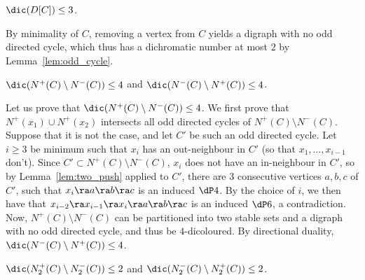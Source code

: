 \begin{claim}\label{clm:C_bounded}
$\dic(D[C]) \leq 3$. 
\end{claim}

\begin{subproof}
By minimality of $C$, removing a vertex from $C$ yields a digraph with no odd directed cycle, which thus has a dichromatic number at most $2$ by Lemma~\ref{lem:odd_cycle}.
\end{subproof}

\begin{claim} \label{clm:N+moinsN-_bounded}
$\dic(N^{+}(C) \setminus N^{-}(C)) \leq 4$ and  $\dic(N^{-}(C) \setminus N^{+}(C)) \leq 4$. 
\end{claim}

\begin{subproof}
Let us prove that $\dic(N^{+}(C) \setminus N^{-}(C)) \leq 4$.  
We first prove that $N^+(x_1) \cup N^+(x_2)$ intersects all odd directed  cycles of $N^{+}(C) \setminus N^{-}(C)$. Suppose that it is not the case, and let $C'$ be such an odd directed  cycle. 
Let $i\geq 3$ be minimum such that $x_i$ has an out-neighbour in $C'$ (so that $x_1, \dots, x_{i-1}$ don't). Since $C'\subset N^+(C)\setminus N^-(C)$, $x_i$ does not have an in-neighbour in $C'$, so by Lemma~\ref{lem:two_push} applied to $C'$, there are $3$ consecutive vertices $a, b, c$ of $C'$, such that $x_i \ra a \ra b \ra c$ is an induced $\dP4$. By the choice of $i$, we then have that $x_{i-2} \ra x_{i-1} \ra x_i \ra a \ra b \ra c$ is an induced $\dP6$, a contradiction.
Now, $N^{+}(C) \setminus N^{-}(C)$ can be partitioned into two stable sets and a digraph with no odd directed cycle, and thus be $4$-dicoloured.  
By directional duality,  $\dic(N^{-}(C) \setminus N^{+}(C)) \leq 4$.
\end{subproof}




\begin{claim}\label{clm:N2+moinsN2-_bounded}
   $\dic(N^{+}_2(C) \setminus N^{-}_2(C)) \leq 2$ and $\dic(N^{-}_2(C) \setminus N^{+}_2(C)) \leq 2$. 
\end{claim}

